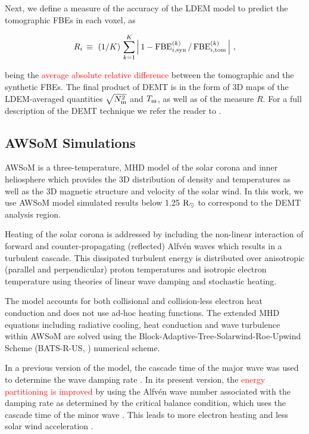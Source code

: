 \documentclass[namedreferences]{solarphysics}
\def\edit#1{\textcolor{Red}{#1}}
\newcommand{\mrsun}{{\rm R_\odot}}
\newcommand{\FBE}{{\rm FBE}}
\newcommand{\Tm}{T_{\rm m}}
\newcommand{\Nsqm}{N^2_{{\rm m}}}
\newcommand{\sqravgN}{\sqrt{\Nsqm}}
\begin{document}
\begin{article}
Next, we define a measure of the accuracy of the LDEM model to predict the tomographic FBEs in each voxel, as

\begin{equation}\label{R}
R_i \, \equiv \ (1/K) \, \sum_{k=1}^K \left| \, 1 - \FBE^{(k)}_{i,\rm syn}\,/\,\FBE^{(k)}_{i,\rm tom}\, \right| \,,
\end{equation}

\noindent 
{being the} \edit{average absolute relative difference} between the tomographic and the synthetic FBEs. {The final product of DEMT is in the form of 3D maps of the LDEM-averaged quantities $\sqravgN$ and $\Tm$, as well as of the measure $R$.} {For a full description of the {DEMT technique} we refer the reader to \citet{frazin_2009}.}

\subsection{{AWSoM Simulations}}\label{awsom} 

{AWSoM is a three-temperature}, MHD model of the solar corona and inner heliosphere which provides the 3D distribution of density and temperatures as well as the 3D magnetic structure and velocity of the solar wind. In this work, we use AWSoM model simulated results below 1.25 $\mrsun$ to correspond to the DEMT analysis region.

{Heating of the solar corona is addressed} by including the non-linear interaction of forward and counter-propagating (reflected) Alfv\'{e}n waves which results in a turbulent cascade. This dissipated turbulent energy is distributed over anisotropic (parallel and perpendicular) proton temperatures and isotropic electron temperature using theories of linear wave damping and stochastic heating.

{The model accounts} for both collisional and collision-less electron heat conduction and does not use ad-hoc heating functions. The extended MHD equations including radiative cooling, heat conduction and wave turbulence within AWSoM \citep{Van2014} are solved using the Block-Adaptive-Tree-Solarwind-Roe-Upwind Scheme (BATS-R-US, \citealp{Pow1999, Tot2012}) numerical scheme. 

{In a previous} version of the model, the cascade time of the major wave was used to determine the wave damping rate \citep{Cha2011, Van2014}. {In its present version, the \edit{energy partitioning is improved}} by using the Alfv\'{e}n wave number associated with the damping rate as determined by the critical balance condition, which uses the cascade time of the minor wave \citep{Lit2007}. This leads to more electron heating and less solar wind acceleration \citep{Van2019b}.


\end{article}
\end{document}
